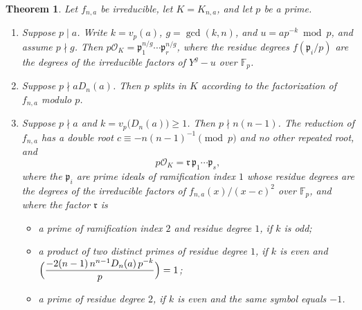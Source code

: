 \documentclass[11pt]{article}
\newtheorem{theorem}{Theorem}
\theoremstyle{definition}
\theoremstyle{remark}
\newcommand{\F}{\mathbb{F}}
\newcommand{\OK}{\mathcal{O}_K}
\newcommand{\leg}[2]{\Bigl(\dfrac{#1}{#2}\Bigr)}
\begin{document}
\begin{theorem}\label{thm:split}
Let $f_{n,a}$ be irreducible, let $K=K_{n,a}$, and let $p$ be a prime.
\begin{enumerate}[label=\textup{(\roman*)}]
\item Suppose $p\mid a$. Write $k=v_p(a)$, $g=\gcd(k,n)$, and
$u=ap^{-k}\bmod p$, and assume $p\nmid g$. Then
$p\OK=\mathfrak{p}_1^{n/g}\cdots\mathfrak{p}_r^{n/g}$, where the residue degrees
$f(\mathfrak{p}_i/p)$ are the degrees of the irreducible factors of $Y^{g}-u$
over $\F_p$.
\item Suppose $p\nmid aD_n(a)$. Then $p$ splits in $K$ according to the
factorization of $f_{n,a}$ modulo $p$.
\item Suppose $p\nmid a$ and $k=v_p\bigl(D_n(a)\bigr)\ge 1$. Then $p\nmid n(n-1)$.
The reduction of $f_{n,a}$ has a double root
$c\equiv -n(n-1)^{-1}\pmod p$ and no other repeated root, and
\[
p\OK=\mathfrak{r}\,\mathfrak{p}_1\cdots\mathfrak{p}_s,
\]
where the $\mathfrak{p}_i$ are prime ideals of ramification index $1$ whose
residue degrees are the degrees of the irreducible factors of
$f_{n,a}(x)/(x-c)^{2}$ over $\F_p$, and where the factor $\mathfrak{r}$ is
\begin{itemize}[leftmargin=1.2em]
\item a prime of ramification index $2$ and residue degree $1$, if $k$ is odd;
\item a product of two distinct primes of residue degree $1$, if $k$ is even and
$\leg{-2(n-1)\,n^{n-1}D_n(a)\,p^{-k}}{p}=1$;
\item a prime of residue degree $2$, if $k$ is even and the same symbol equals $-1$.
\end{itemize}
\end{enumerate}
\end{theorem}
\end{document}
